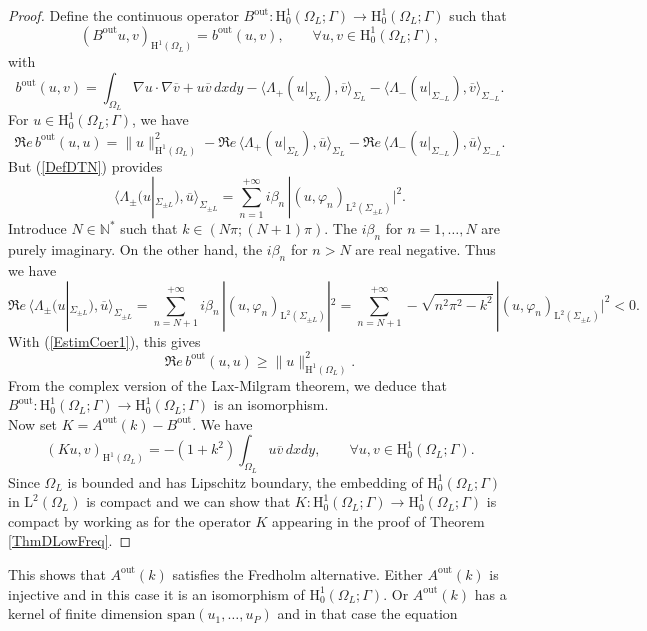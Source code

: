 \documentclass[11pt,a4paper]{report}
\newcommand{\dsp}{\displaystyle}
\newcommand{\Om}{\Omega}
\newcommand{\mrm}[1]{\mathrm{#1}}
\newcommand{\N}{\mathbb{N}}
\newcommand{\mL}{\mrm{L}}
\newcommand{\mH}{\mrm{H}}
\begin{document}
\begin{proof}
Define the continuous operator  $B^{\mrm{out}}:\mH^1_0(\Om_L;\Gamma)\to\mH^1_0(\Om_L;\Gamma)$ such that 
\[
(B^{\mrm{out}}u,v)_{\mH^1(\Om_L)}=b^{\mrm{out}}(u,v),\qquad\forall u,v\in \mH^1_0(\Om_L;\Gamma),
\]
with
\[
b^{\mrm{out}}(u,v)=\int_{\Om_L}\nabla u\cdot\nabla\overline{v}+u\overline{v}\,dxdy-\langle\Lambda_+(u|_{\Sigma_{L}}),\overline{v} \rangle_{\Sigma_L}-\langle\Lambda_-(u|_{\Sigma_{-L}}),\overline{v}\rangle_{\Sigma_{-L}}.
\]
For $u\in\mH^1_0(\Om_L;\Gamma)$, we have 
\begin{equation}\label{EstimCoer1}
\Re e\,b^{\mrm{out}}(u,u)=\|u\|^2_{\mH^1(\Om_L)}-\Re e\,\langle\Lambda_+(u|_{\Sigma_{L}}),\overline{u}\rangle_{\Sigma_L}-\Re e\,\langle\Lambda_-(u|_{\Sigma_{-L}}),\overline{u} \rangle_{\Sigma_{-L}}.
\end{equation}
But (\ref{DefDTN}) provides
\[
\langle\Lambda_\pm(u|_{\Sigma_{\pm L}}),\overline{u}\rangle_{\Sigma_{\pm L}} = \dsp\sum_{n=1}^{+\infty} i\beta_n\, |(u,\varphi_n)_{\mL^2(\Sigma_{\pm L})}|^2.
\]
Introduce $N\in\N^\ast$ such that $k\in(N\pi;(N+1)\pi)$. The $i\beta_n$ for $n=1,\dots,N$ are purely imaginary. On the other hand, the $i\beta_n$ for $n>N$ are real negative. Thus we have
\[
\Re e\,\langle\Lambda_\pm(u|_{\Sigma_{\pm L}}),\overline{u}\rangle_{\Sigma_{\pm L}}=\sum_{n=N+1}^{+\infty} i\beta_n\, |(u,\varphi_n)_{\mL^2(\Sigma_{\pm L})}|^2=\sum_{n=N+1}^{+\infty} -\sqrt{n^2\pi^2-k^2}\, |(u,\varphi_n)_{\mL^2(\Sigma_{\pm L})}|^2<0.
\]
With (\ref{EstimCoer1}), this gives
\[
\Re e\,b^{\mrm{out}}(u,u) \ge \|u\|^2_{\mH^1(\Om_L)}.
\]
From the complex version of the Lax-Milgram theorem, we deduce that $B^{\mrm{out}}:\mH^1_0(\Om_L;\Gamma)\to\mH^1_0(\Om_L;\Gamma)$ is an isomorphism.\\
\newline
Now set $K=A^{\mrm{out}}(k)-B^{\mrm{out}}$. We have 
\[
(Ku,v)_{\mH^1(\Om_L)}=-(1+k^2)\int_{\Om_L}u\overline{v}\,dxdy,\qquad\forall u,v\in \mH^1_0(\Om_L;\Gamma).
\] 
Since $\Om_L$ is bounded and has Lipschitz boundary, the embedding of $\mH^1_0(\Om_L;\Gamma)$ in $\mL^2(\Om_L)$ is compact and we can show that $K:\mH^1_0(\Om_L;\Gamma)\to\mH^1_0(\Om_L;\Gamma)$ is compact by working as for the operator $K$ appearing in the proof of Theorem \ref{ThmDLowFreq}.
\end{proof}
\noindent This shows that $A^{\mrm{out}}(k)$ satisfies the Fredholm alternative. Either $A^{\mrm{out}}(k)$ is injective and in this case it is an isomorphism of $\mH^1_0(\Om_L;\Gamma)$. Or $A^{\mrm{out}}(k)$ has a kernel of finite dimension $\mrm{span}(u_1,\dots,u_P)$ and in that case the equation 
\end{document}
